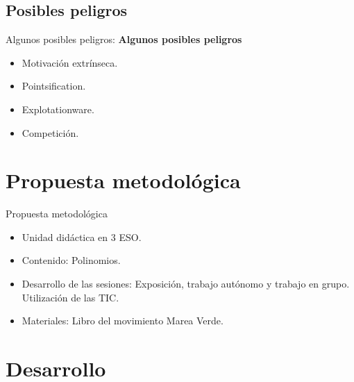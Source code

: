 \documentclass[10pt,notes,compress,usetitleprogressbar,aspectratio=1610]{beamer}
\begin{document}
\subsection{Posibles peligros}
\begin{frame}{Algunos posibles peligros:}
\textbf{Algunos posibles peligros}
\begin{center}
\begin{itemize}
	\item Motivación extrínseca.
	\item Pointsification.
	\item Explotationware.
	\item Competición.
\end{itemize}
\end{center}
\end{frame}


\section{Propuesta metodológica}
\begin{frame}{Propuesta metodológica}
\begin{itemize}
	\item Unidad didáctica en 3 ESO.
	\item Contenido: Polinomios.
	\item Desarrollo de las sesiones: Exposición, trabajo autónomo y trabajo en grupo. Utilización de las TIC.
	\item Materiales: Libro del movimiento Marea Verde.
\end{itemize}
\end{frame}
 
\newcommand{\eaes}{Estándares de Aprendizaje Evaluables\xspace}


\section{Desarrollo}
\end{document}

